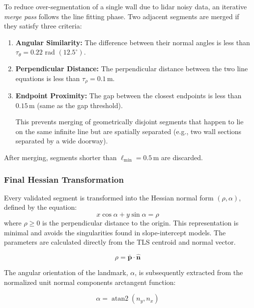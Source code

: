 \documentclass[11pt]{article}
\begin{document}
To reduce over-segmentation of a single wall due to lidar noisy data, an iterative \textit{merge pass} follows the line fitting phase. Two adjacent segments are merged if they satisfy three criteria:
\begin{enumerate}
	\item \textbf{Angular Similarity:} The difference between their normal angles is less than $\tau_{\theta} = 0.22$ rad $(12.5^{\circ})$.
	
	\item \textbf{Perpendicular Distance:} The perpendicular distance between the two line equations is less than $\tau_{\rho} = 0.1$\,m.
		
	\item \textbf{Endpoint Proximity:} The gap between the closest endpoints is less than $0.15$\,m (same as the gap threshold).
	
 	This prevents merging of geometrically disjoint segments that happen to lie on the same infinite line but are spatially separated (e.g., two wall sections separated by a wide doorway).
\end{enumerate}

After merging, segments shorter than $\ell_{\min} = 0.5$\,m are discarded.

\subsubsection{Final Hessian Transformation}
Every validated segment is transformed into the Hessian normal form $(\rho, \alpha)$, defined by the equation:
\begin{equation}
	x \cos \alpha + y \sin \alpha = \rho
\end{equation}
where $\rho \geq 0$ is the perpendicular distance to the origin. This representation is minimal and avoids the singularities found in slope-intercept models. The parameters are calculated directly from the TLS centroid and normal vector.

\begin{equation}
	\rho = \mathbf{\bar{p}} \cdot \mathbf{\hat{n}}
\end{equation}

The angular orientation of the landmark, $\alpha$, is subsequently extracted from the normalized unit normal components arctangent function:

\begin{equation}
	\alpha = \operatorname{atan2}(n_{y}, n_{x})
\end{equation}
\end{document}
